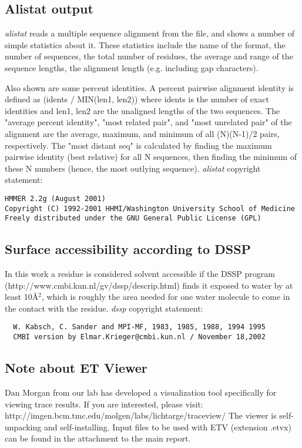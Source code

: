 \subsection{Alistat output}
\emph{alistat} reads a multiple sequence alignment from the file, and shows a number of simple statistics about it. 
These statistics include the name of the format, the number of sequences, 
the total number of residues, the average and range of the sequence lengths, the alignment length (e.g. including gap characters).

Also shown are some percent identities. A percent pairwise alignment identity is defined as (idents / MIN(len1, len2)) 
where idents is the number of exact identities and len1, len2 are the unaligned lengths of the two sequences. 
The "average percent identity", "most related pair", and "most unrelated pair" of the alignment are the average,
 maximum, and minimum of all (N)(N-1)/2 pairs, respectively. 
The "most distant seq" is calculated by finding the maximum pairwise identity 
(best relative) for all N sequences, then finding the minimum of these N numbers (hence, the most outlying sequence). 
\emph{alistat} copyright statement:
\begin{verbatim}
HMMER 2.2g (August 2001)
Copyright (C) 1992-2001 HHMI/Washington University School of Medicine
Freely distributed under the GNU General Public License (GPL)
\end{verbatim}



\subsection{Surface accessibility according to DSSP}
 In this work a residue is considered solvent accessible if the \newline
 DSSP program (http://www.cmbi.kun.nl/gv/dssp/descrip.html) \newline
  finds it exposed to water by at least 10\AA$^2$, 
which is roughly the area  needed for one water molecule
to come in the contact with the residue.
\emph{dssp} copyright statement:
\begin{verbatim}
  W. Kabsch, C. Sander and MPI-MF, 1983, 1985, 1988, 1994 1995
  CMBI version by Elmar.Krieger@cmbi.kun.nl / November 18,2002
\end{verbatim}

\subsection{Note about ET Viewer}
 Dan Morgan from our lab has developed a visualization tool specifically for
viewing trace results. If you are interested, please visit:\newline
http://imgen.bcm.tmc.edu/molgen/labs/lichtarge/traceview/\newline
The viewer is self-unpacking and self-installing.
Input files to be used with ETV (extension .etvx) can be found in the attachment to the main report.


